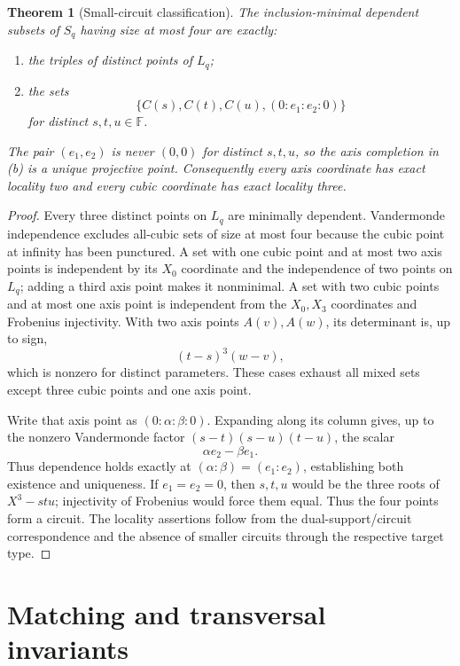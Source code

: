 \documentclass[11pt]{article}
\newtheorem{theorem}{Theorem}[section]
\theoremstyle{definition}
\theoremstyle{remark}
\newcommand{\F}{\mathbb{F}}
\begin{document}
\begin{theorem}[Small-circuit classification]\label{thm:circuits}
The inclusion-minimal dependent subsets of $S_q$ having size at most four
are exactly:
\begin{enumerate}[label=(\alph*),leftmargin=2em]
\item the triples of distinct points of $L_q$;
\item the sets
\[
 \{C(s),C(t),C(u),(0:e_1:e_2:0)\}
\]
for distinct $s,t,u\in\F$.
\end{enumerate}
The pair $(e_1,e_2)$ is never $(0,0)$ for distinct $s,t,u$, so the axis
completion in (b) is a unique projective point.  Consequently every axis
coordinate has exact locality two and every cubic coordinate has exact
locality three.
\end{theorem}

\begin{proof}
Every three distinct points on $L_q$ are minimally dependent.  Vandermonde
independence excludes all-cubic sets of size at most four because the cubic
point at infinity has been punctured.  A set with one cubic point and at
most two axis points is independent by its $X_0$ coordinate and the
independence of two points on $L_q$; adding a third axis point makes it
nonminimal.  A set with two cubic points and at most one axis point is
independent from the $X_0,X_3$ coordinates and Frobenius injectivity.  With
two axis points $A(v),A(w)$, its determinant is, up to sign,
\[
 (t-s)^3(w-v),
\]
which is nonzero for distinct parameters.  These cases exhaust all mixed
sets except three cubic points and one axis point.

Write that axis point as $(0:\alpha:\beta:0)$.  Expanding along its column
gives, up to the nonzero Vandermonde factor
$(s-t)(s-u)(t-u)$, the scalar
\[
 \alpha e_2-\beta e_1.
\]
Thus dependence holds exactly at $(\alpha:\beta)=(e_1:e_2)$, establishing
both existence and uniqueness.
If $e_1=e_2=0$, then $s,t,u$ would be the three roots of
$X^3-stu$; injectivity of Frobenius would force them equal.  Thus the four
points form a circuit.  The locality assertions follow from the
dual-support/circuit correspondence and the absence of smaller circuits
through the respective target type.
\end{proof}

\section{Matching and transversal invariants}
\label{sec:invariants}
\end{document}
